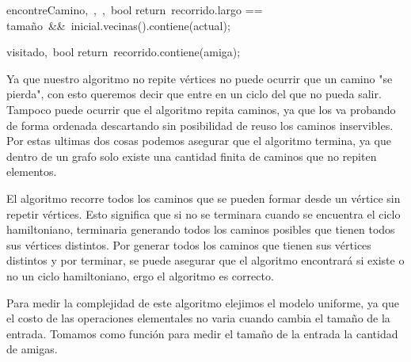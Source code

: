 \begin{algorithm}
{encontreCamino}{,\ ,\ ,\ }{bool}
    return\ recorrido.largo == tamaño\ \&\&\ inicial.vecinas().contiene(actual);
\end{algorithm}

\begin{algorithm}
{visitado}{,\ }{bool}
    return\ recorrido.contiene(amiga);
\end{algorithm}


    
Ya que nuestro algoritmo no repite vértices no puede ocurrir que un camino "se pierda", con esto queremos decir que entre en un ciclo del que no pueda salir. Tampoco puede ocurrir que el algoritmo repita caminos, ya que los va probando de forma ordenada descartando sin posibilidad de reuso los caminos inservibles. Por estas ultimas dos cosas podemos asegurar que el algoritmo termina, ya que dentro de un grafo solo existe una cantidad finita de caminos que no repiten elementos.

El algoritmo recorre todos los caminos que se pueden formar desde un vértice sin repetir vértices. Esto significa que si no se terminara cuando se encuentra el ciclo hamiltoniano, terminaria generando todos los caminos posibles que tienen todos sus vértices distintos. Por generar todos los caminos que tienen sus vértices distintos y por terminar, se puede asegurar que el algoritmo encontrará si existe o no un ciclo hamiltoniano, ergo el algoritmo es correcto.

Para medir la complejidad de este algoritmo elejimos el modelo uniforme, ya que el costo de las operaciones elementales no varia cuando cambia el tamaño de la entrada. Tomamos como función para medir el tamaño de la entrada la cantidad de amigas.


